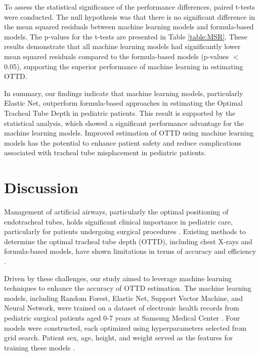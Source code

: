 \documentclass[11pt]{article}
\begin{document}
To assess the statistical significance of the performance differences, paired t-tests were conducted. The null hypothesis was that there is no significant difference in the mean squared residuals between machine learning models and formula-based models. The p-values for the t-tests are presented in Table \ref{table:MSR}. These results demonstrate that all machine learning models had significantly lower mean squared residuals compared to the formula-based models (p-values $<$ 0.05), supporting the superior performance of machine learning in estimating OTTD.

In summary, our findings indicate that machine learning models, particularly Elastic Net, outperform formula-based approaches in estimating the Optimal Tracheal Tube Depth in pediatric patients. This result is supported by the statistical analysis, which showed a significant performance advantage for the machine learning models. Improved estimation of OTTD using machine learning models has the potential to enhance patient safety and reduce complications associated with tracheal tube misplacement in pediatric patients.

\section*{Discussion}

Management of artificial airways, particularly the optimal positioning of endotracheal tubes, holds significant clinical importance in pediatric care, particularly for patients undergoing surgical procedures \cite{Kollef1994EndotrachealTM, Cook2005ThePL}. Existing methods to determine the optimal tracheal tube depth (OTTD), including chest X-rays and formula-based models, have shown limitations in terms of accuracy and efficiency \cite{Yoo2021DeepLF, Bari2020MachinelearningRA}. 

Driven by these challenges, our study aimed to leverage machine learning techniques to enhance the accuracy of OTTD estimation. The machine learning models, including Random Forest, Elastic Net, Support Vector Machine, and Neural Network, were trained on a dataset of electronic health records from pediatric surgical patients aged 0-7 years at Samsung Medical Center \cite{Zhang2019EfficacyAS, Stapleton2017RiskFF}. Four models were constructed, each optimized using hyperparameters selected from grid search. Patient sex, age, height, and weight served as the features for training these models \cite{Wu2019HyperparameterOF, Rauber2017FoolboxAP}.
\end{document}
